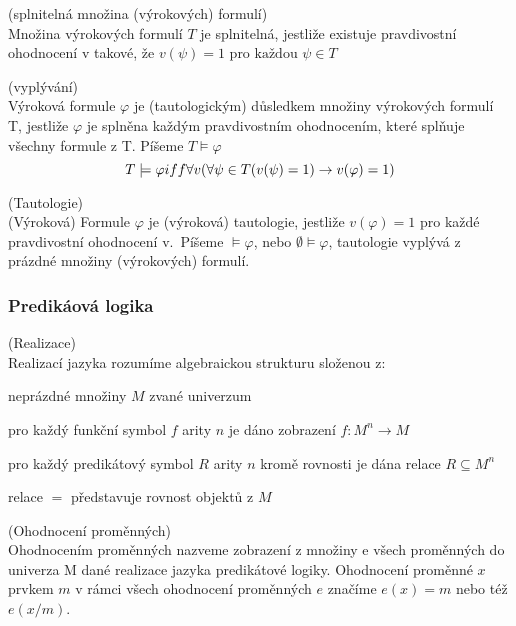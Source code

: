 \begin{definition}{(splnitelná množina (výrokových) formulí)}\\
Množina výrokových formulí $T$ je splnitelná, jestliže existuje pravdivostní ohodnocení v takové, že $v(\psi) = 1\mbox{ pro každou }\psi \in T$
\end{definition}

\begin{definition}{(vyplývání)}\\
Výroková formule $\varphi$ je (tautologickým) důsledkem množiny výrokových formulí T, jestliže $\varphi$ je splněna
každým pravdivostním ohodnocením, které splňuje všechny formule z T. Píšeme $T \models \varphi$
\begin{equation}
T \models \varphi iff \forall v(\forall\psi \in T(v(\psi) = 1) \rightarrow v(\varphi) = 1)
\end{equation}
\end{definition}

\begin{definition}{(Tautologie)}\\
(Výroková) Formule $\varphi$ je (výroková) tautologie, jestliže $v(\varphi) = 1$ pro každé pravdivostní ohodnocení v.\
Píšeme $\models \varphi$, nebo $\emptyset \models \varphi$, tautologie vyplývá z prázdné množiny (výrokových) formulí.
\end{definition}

\subsubsection{Predikáová logika}

\begin{definition}{(Realizace)}\\
Realizací jazyka rozumíme algebraickou strukturu složenou z:
\bce[(i)]
\item  neprázdné množiny $M$ zvané univerzum
\item pro každý funkční symbol $f$ arity $n$ je dáno zobrazení $f: M^n \rightarrow M$
\item pro každý predikátový symbol $R$ arity $n$ kromě rovnosti je dána relace $R \subseteq M^n$
\item relace $=$ představuje rovnost objektů z $M$
\ece
\end{definition}

\begin{definition}{(Ohodnocení proměnných)}\\
Ohodnocením proměnných nazveme zobrazení z množiny e všech proměnných do univerza M dané realizace jazyka predikátové logiky.
Ohodnocení proměnné $x$ prvkem $m$ v rámci všech ohodnocení proměnných $e$ značíme $e(x) = m$ nebo též $e(x/m)$.
\end{definition}

